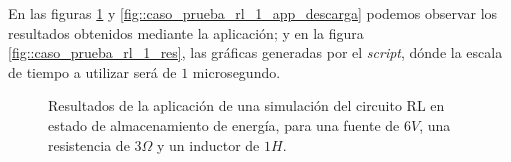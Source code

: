 \documentclass[../main.tex]{subfiles}
\begin{document}
En las figuras \ref{fig::caso_prueba_rl_1_app_carga} y \ref{fig::caso_prueba_rl_1_app_descarga} podemos observar los resultados obtenidos mediante la aplicación; y en la figura \ref{fig::caso_prueba_rl_1_res}, las gráficas generadas por el \textit{script}, dónde la escala de tiempo a utilizar será de $1$ microsegundo.\\


\begin{figure}[!h]
    \centering
    \quad


    \caption{Resultados de la aplicación de una simulación del circuito RL en estado de almacenamiento de energía, para una fuente de $6V$, una resistencia de $3 \Omega$ y un inductor de $1H$.}

    \label{fig::caso_prueba_rl_1_app_carga}
\end{figure}
\end{document}
